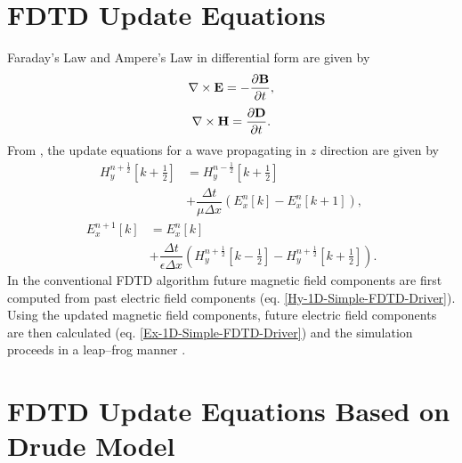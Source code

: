 \documentclass{article}
\begin{document}
\section{FDTD Update Equations}

Faraday's Law and Ampere's Law in differential form are given by
\begin{equation}
\centering
\nabla \times \textbf{E} = - \dfrac{\partial \textbf{B}}{\partial t},
\label{Faraday's Law}
\end{equation}
\begin{equation}
\centering
\nabla \times \textbf{H} = \dfrac{\partial \textbf{D}}{\partial t}.
\label{Ampere's Law}
\end{equation}
From \cite{Yee1966}, the update equations for a wave propagating in $z$ direction are given by
\begin{equation}
\begin{split}
H^{n+\frac{1}{2}}_y \left[k+\frac{1}{2}\right]&=H^{n-\frac{1}{2}}_y \left[k+\frac{1}{2}\right]\\ &+
\dfrac{\Delta t}{\mu \Delta x} \left( E^{n}_x \left[k\right] - E^{n}_x \left[k+1\right] \right),
\end{split}
\label{Hy-1D-Simple-FDTD-Driver}
\end{equation}
\begin{equation}
\begin{split}
E^{n+1}_x \left[k\right]&=E^{n}_x \left[k\right]\\&+ \dfrac{\Delta t}{\epsilon \Delta x} \left( H^{n+\frac{1}{2}}_y \left[k-\frac{1}{2}\right] - H^{n+\frac{1}{2}}_y \left[k+\frac{1}{2}\right] \right).
\end{split}
\label{Ex-1D-Simple-FDTD-Driver}
\end{equation}
In the conventional FDTD algorithm future magnetic field components are first computed from past electric field components (eq. \ref{Hy-1D-Simple-FDTD-Driver}). Using the updated magnetic field components, future electric field components are then calculated (eq. \ref{Ex-1D-Simple-FDTD-Driver}) and the simulation proceeds in a leap--frog manner \cite{Yee1966}.

\section{FDTD Update Equations Based on Drude Model}
\end{document}
